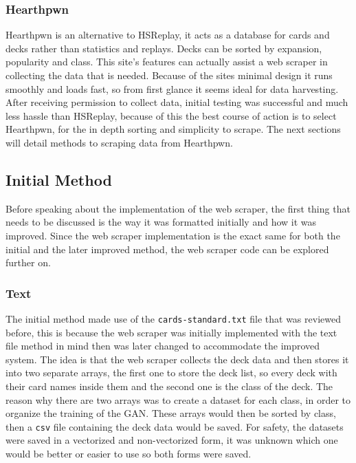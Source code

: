 \documentclass{report} %
\begin{document}
\subsubsection{Hearthpwn}
Hearthpwn is an alternative to HSReplay, it acts as a database for cards and decks rather than statistics and replays. Decks can be sorted by expansion, popularity and class. This site's features can actually assist a web scraper in collecting the data that is needed. Because of the sites minimal design it runs smoothly and loads fast, so from first glance it seems ideal for data harvesting. After receiving permission to collect data, initial testing was successful and much less hassle than HSReplay, because of this the best course of action is to select Hearthpwn, for the in depth sorting and simplicity to scrape. The next sections will detail methods to scraping data from Hearthpwn.
\subsection{Initial Method}
Before speaking about the implementation of the web scraper, the first thing that needs to be discussed is the way it was formatted initially and how it was improved. Since the web scraper implementation is the exact same for both the initial and the later improved method, the web scraper code can be explored further on.
\subsubsection{Text}
The initial method made use of the \nolinkurl{cards-standard.txt} file that was reviewed before, this is because the web scraper was initially implemented with the text file method in mind then was later changed to accommodate the improved system. The idea is that the web scraper collects the deck data and then stores it into two separate arrays, the first one to store the deck list, so every deck with their card names inside them and the second one is the class of the deck. The reason why there are two arrays was to create a dataset for each class, in order to organize the training of the GAN. These arrays would then be sorted by class, then a \nolinkurl{csv} file containing the deck data would be saved. For safety, the datasets were saved in a vectorized and non-vectorized form, it was unknown which one would be better or easier to use so both forms were saved.
\end{document}

